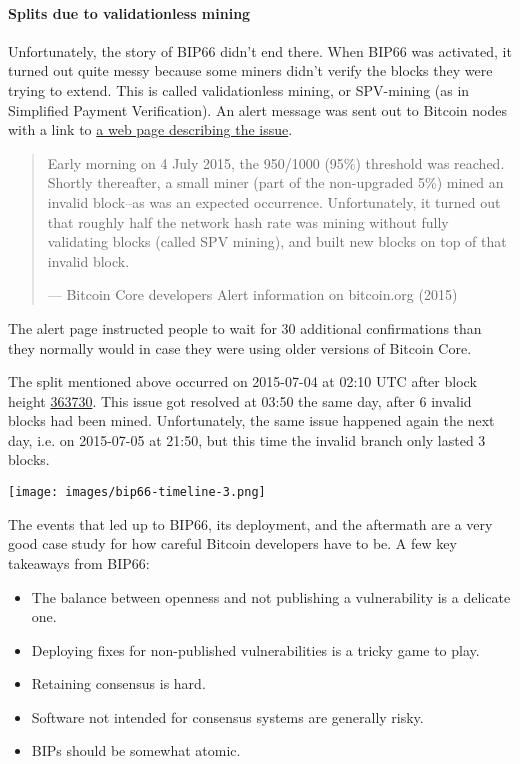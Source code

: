 \hypertarget{bip66splits}{%
\paragraph{Splits due to validationless mining}\label{bip66splits}}

Unfortunately, the story of BIP66 didn't end there. When BIP66 was
activated, it turned out quite messy because some miners didn't verify
the blocks they were trying to extend. This is called validationless
mining, or SPV-mining (as in Simplified Payment Verification). An alert
message was sent out to Bitcoin nodes with a link to
\href{https://bitcoin.org/en/alert/2015-07-04-spv-mining}{a web page
describing the issue}.

\begin{quote}
Early morning on 4 July 2015, the 950/1000 (95\%) threshold was reached.
Shortly thereafter, a small miner (part of the non-upgraded 5\%) mined
an invalid block--as was an expected occurrence. Unfortunately, it
turned out that roughly half the network hash rate was mining without
fully validating blocks (called SPV mining), and built new blocks on top
of that invalid block.

---  Bitcoin Core developers Alert information on bitcoin.org (2015)
\end{quote}

The alert page instructed people to wait for 30 additional confirmations
than they normally would in case they were using older versions of
Bitcoin Core.

The split mentioned above occurred on 2015-07-04 at 02:10 UTC after
block height
\href{https://mempool.space/block/000000000000000006a320d752b46b532ec0f3f815c5dae467aff5715a6e579e}{363730}.
This issue got resolved at 03:50 the same day, after 6 invalid blocks
had been mined. Unfortunately, the same issue happened again the next
day, i.e. on 2015-07-05 at 21:50, but this time the invalid branch only
lasted 3 blocks.

\texttt{[image: images/bip66-timeline-3.png]}

The events that led up to BIP66, its deployment, and the aftermath are a
very good case study for how careful Bitcoin developers have to be. A
few key takeaways from BIP66:

\begin{itemize}
\item
  The balance between openness and not publishing a vulnerability is a
  delicate one.
\item
  Deploying fixes for non-published vulnerabilities is a tricky game to
  play.
\item
  Retaining consensus is hard.
\item
  Software not intended for consensus systems are generally risky.
\item
  BIPs should be somewhat atomic.
\end{itemize}

